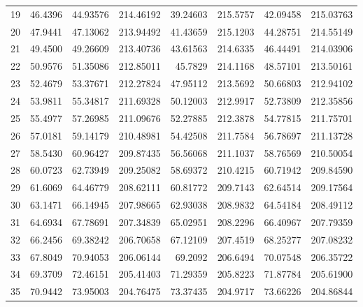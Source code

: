 \begin{table}[ht!]
{\begin{tabular}{@{}rrrrrrrr@{}}
19 & 46.4396 & 44.93576 & 214.46192 & 39.24603 & 215.5757 & 42.09458 & 215.03763 \\
20 & 47.9441 & 47.13062 & 213.94492 & 41.43659 & 215.1203 & 44.28751 & 214.55149 \\
21 & 49.4500 & 49.26609 & 213.40736 & 43.61563 & 214.6335 & 46.44491 & 214.03906 \\
22 & 50.9576 & 51.35086 & 212.85011 & 45.7829  & 214.1168 & 48.57101 & 213.50161 \\
23 & 52.4679 & 53.37671 & 212.27824 & 47.95112 & 213.5692 & 50.66803 & 212.94102 \\
24 & 53.9811 & 55.34817 & 211.69328 & 50.12003 & 212.9917 & 52.73809 & 212.35856 \\
25 & 55.4977 & 57.26985 & 211.09676 & 52.27885 & 212.3878 & 54.77815 & 211.75701 \\
26 & 57.0181 & 59.14179 & 210.48981 & 54.42508 & 211.7584 & 56.78697 & 211.13728 \\
27 & 58.5430 & 60.96427 & 209.87435 & 56.56068 & 211.1037 & 58.76569 & 210.50054 \\
28 & 60.0723 & 62.73949 & 209.25082 & 58.69372 & 210.4215 & 60.71942 & 209.84590 \\
29 & 61.6069 & 64.46779 & 208.62111 & 60.81772 & 209.7143 & 62.64514 & 209.17564 \\
30 & 63.1471 & 66.14945 & 207.98665 & 62.93038 & 208.9832 & 64.54184 & 208.49112 \\
31 & 64.6934 & 67.78691 & 207.34839 & 65.02951 & 208.2296 & 66.40967 & 207.79359 \\
32 & 66.2456 & 69.38242 & 206.70658 & 67.12109 & 207.4519 & 68.25277 & 207.08232 \\
33 & 67.8049 & 70.94053 & 206.06144 & 69.2092  & 206.6494 & 70.07548 & 206.35722 \\
34 & 69.3709 & 72.46151 & 205.41403 & 71.29359 & 205.8223 & 71.87784 & 205.61900 \\
35 & 70.9442 & 73.95003 & 204.76475 & 73.37435 & 204.9717 & 73.66226 & 204.86844 \\ \bottomrule
\end{tabular}%
}
\end{table}
\vfill
\clearpage

